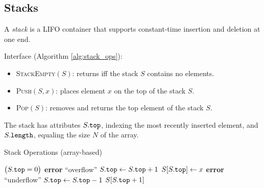 \subsection{Stacks}
\label{subsec:stacks}

\begin{definition}[Stack]
A \emph{stack} is a LIFO container that
supports constant-time insertion and deletion at one end.
\end{definition}

\begin{figure}[htb]
  \centering
  \label{fig:stack}
\end{figure}

Interface (Algorithm \ref{alg:stack_ops}):
\begin{itemize}[before={\parskip=0pt},nosep]
  \item \textsc{StackEmpty}\((S)\): returns \tru{} iff the stack \(S\) contains no elements.
  \item \textsc{Push}\((S,x)\): places element \(x\) on the top of the stack \(S\).
  \item \textsc{Pop}\((S)\): removes and returns the top element of the stack \(S\).
\end{itemize}

The stack has attributes \(S\mathtt{.}\mathtt{top}\), indexing the most recently inserted element, and \(S\mathtt{.}\mathtt{length}\), equaling the size \(N\) of the array.



\begin{algorithm}[htb]
  \caption{Stack Operations (array-based)}
  \label{alg:stack_ops}
  \begin{algorithmic}[1]
      \State \Return $\bigl(S\mathtt{.}\mathtt{top}=0\bigr)$
    \EndFunction
        \State \textbf{error} ``overflow''
      \EndIf
      \State $S\mathtt{.}\mathtt{top}\gets S\mathtt{.}\mathtt{top}+1$
      \State $S[S\mathtt{.}\mathtt{top}] \gets x$
    \EndFunction
        \State \textbf{error} ``underflow''
      \EndIf
      \State $S\mathtt{.}\mathtt{top}\gets S\mathtt{.}\mathtt{top}-1$
      \State \Return $S[S\mathtt{.}\mathtt{top}+1]$
    \EndFunction
  \end{algorithmic}
\end{algorithm}

